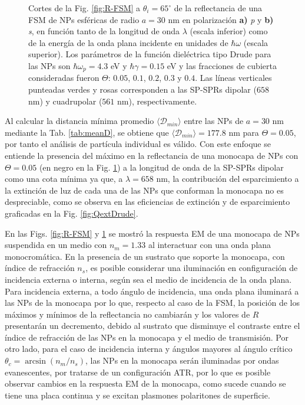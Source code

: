 \begin{figure}[h!]
	\caption{Cortes de la Fig. \ref{fig:R-FSM} a $\theta_i = 65^\circ$ de la reflectancia de una FSM de NPs esféricas de radio $a=30$ nm en polarización \textbf{a)} \emph{p} y \textbf{b)} \emph{s}, en función tanto de la longitud de onda $\lambda$ (escala inferior) como de la energía de la onda plana incidente en unidades de $\hbar\omega$ (escala superior). Los parámetros de la función dieléctrica tipo Drude para las NPs son $\hbar\omega_p = 4.3$ eV y $\hbar\gamma = 0.15$ eV y las fracciones de cubierta consideradas fueron $\Theta$: $0. 05$, $0. 1$, $0. 2$, $0. 3$ y $0. 4$. Las líneas verticales punteadas verdes y rosas corresponden a las SP-SPRs dipolar ($658$ nm) y cuadrupolar ($561$ nm), respectivamente.}\label{fig:FSM-Cuts}
	\end{figure}	

Al calcular la distancia mínima promedio $\langle\mathscr{D}_{min}\rangle$ entre las NPs  de $a = 30$ nm mediante la Tab. \ref{tab:meanD}, se obtiene que $\langle\mathscr{D}_{min}\rangle  = 177.8$ nm para $\Theta = 0.05$, por tanto el análisis de partícula individual es válido. Con este enfoque se entiende la presencia del máximo en la reflectancia de una monocapa  de NPs con $\Theta=0.05$ (en negro en la Fig. \ref{fig:FSM-Cuts}) a la longitud de onda de la SP-SPRs dipolar como una cota mínima ya que, a $\lambda=658$ nm, la contribución del esparcimiento a la extinción de luz de cada una de las NPs que conforman la monocapa no es despreciable, como se observa en las eficiencias de extinción y de esparcimiento graficadas en la Fig. \ref{fig:QextDrude}.

En las Figs. \ref{fig:R-FSM} y \ref{fig:FSM-Cuts} se mostró la respuesta EM de una monocapa de NPs suspendida en un medio con $n_m=1.33$ al interactuar con una onda plana monocromática. En la presencia de un sustrato que soporte la monocapa, con índice de refracción $n_s$, es posible considerar una iluminación en configuración de incidencia externa o interna, seg\'un sea el medio de incidencia de la onda plana. Para incidencia externa, a todo ángulo de incidencia,  una onda plana iluminará a las NPs de la monocapa por lo que, respecto al caso de la FSM, la posición de los máximos y mínimos de la reflectancia no cambiarán y los valores de $R$ presentarán un decremento, debido al sustrato que disminuye el contraste entre el índice de refracción de las NPs en la monocapa y el medio de transmisión. Por otro lado, para el caso de incidencia interna y ángulos mayores al ángulo crítico $\theta_c = \arcsin(n_m/n_s)$, las NPs en la monocapa serán iluminadas por ondas evanescentes, por tratarse de un configuración ATR, por lo que es posible  observar cambios en la respuesta EM de la monocapa, como sucede  cuando se tiene una placa continua y se excitan plasmones polaritones de superficie.

